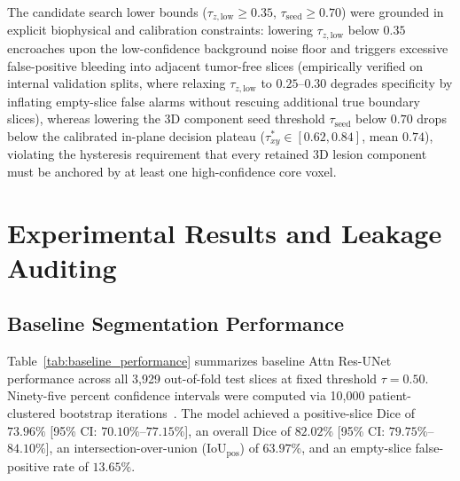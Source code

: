 \documentclass[preprint,12pt,authoryear]{elsarticle}
\begin{document}
The candidate search lower bounds ($\tau_{z,\mathrm{low}} \ge 0.35$, $\tau_{\mathrm{seed}} \ge 0.70$) were grounded in explicit biophysical and calibration constraints: lowering $\tau_{z,\mathrm{low}}$ below $0.35$ encroaches upon the low-confidence background noise floor and triggers excessive false-positive bleeding into adjacent tumor-free slices (empirically verified on internal validation splits, where relaxing $\tau_{z,\mathrm{low}}$ to $0.25$--$0.30$ degrades specificity by inflating empty-slice false alarms without rescuing additional true boundary slices), whereas lowering the 3D component seed threshold $\tau_{\mathrm{seed}}$ below $0.70$ drops below the calibrated in-plane decision plateau ($\tau_{xy}^* \in [0.62, 0.84]$, mean $0.74$), violating the hysteresis requirement that every retained 3D lesion component must be anchored by at least one high-confidence core voxel.

\section{Experimental Results and Leakage Auditing}
\label{sec:results}

\subsection{Baseline Segmentation Performance}
Table~\ref{tab:baseline_performance} summarizes baseline Attn Res-UNet performance across all 3,929 out-of-fold test slices at fixed threshold $\tau = 0.50$. Ninety-five percent confidence intervals were computed via 10,000 patient-clustered bootstrap iterations~\citep{efron1994introduction}. The model achieved a positive-slice Dice of $73.96\%$ [95\% CI: $70.10\%$--$77.15\%$], an overall Dice of $82.02\%$ [95\% CI: $79.75\%$--$84.10\%$], an intersection-over-union ($\text{IoU}_{\text{pos}}$) of $63.97\%$, and an empty-slice false-positive rate of $13.65\%$.
\end{document}
